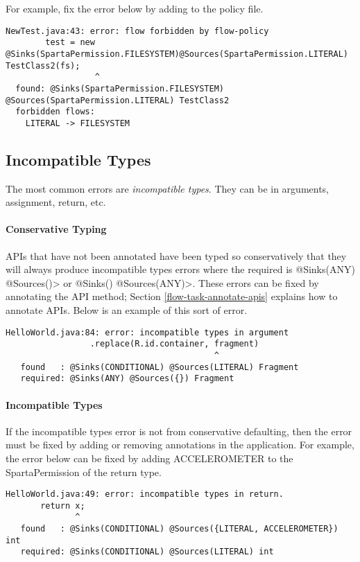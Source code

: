 For example, fix the error below by adding  to the policy file.
\begin{Verbatim}
NewTest.java:43: error: flow forbidden by flow-policy  
        test = new @Sinks(SpartaPermission.FILESYSTEM)@Sources(SpartaPermission.LITERAL) TestClass2(fs);
                  ^
  found: @Sinks(SpartaPermission.FILESYSTEM) @Sources(SpartaPermission.LITERAL) TestClass2 
  forbidden flows:
    LITERAL -> FILESYSTEM
\end{Verbatim}

\subsection{Incompatible Types}
The most common errors are \emph{incompatible types}.  They can be in arguments,  assignment, return, etc.

\paragraph{Conservative Typing}

APIs that have not been annotated have been typed so conservatively that they will always produce incompatible types errors where the required is \<@Sinks(ANY) @Sources({})> or 
\<@Sinks({}) @Sources(ANY)>.  These errors can be fixed by annotating the API method; 
Section \ref{flow-task-annotate-apis} explains how to annotate APIs. 
Below is an example of this sort of error.

\begin{Verbatim}
HelloWorld.java:84: error: incompatible types in argument
                 .replace(R.id.container, fragment)
                                          ^
   found   : @Sinks(CONDITIONAL) @Sources(LITERAL) Fragment
   required: @Sinks(ANY) @Sources({}) Fragment
\end{Verbatim}

\paragraph{Incompatible Types}

If the incompatible types error is not from conservative defaulting, then the error must be fixed by adding or
removing annotations in the application.  For example, the error below can be fixed by adding ACCELEROMETER to the SpartaPermission of the return type.  

\begin{Verbatim}
HelloWorld.java:49: error: incompatible types in return.
       return x;
              ^
   found   : @Sinks(CONDITIONAL) @Sources({LITERAL, ACCELEROMETER}) int
   required: @Sinks(CONDITIONAL) @Sources(LITERAL) int
\end{Verbatim}


